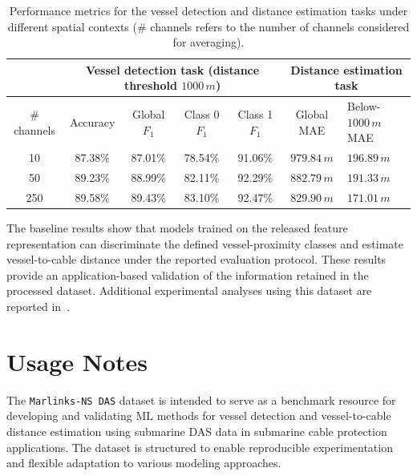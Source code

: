 \documentclass[11pt]{article}
\begin{document}
\begin{table}[htbp]
  \caption{Performance metrics for the vessel detection and distance estimation tasks under different spatial contexts (\textrm{\# channels} refers to the number of channels considered for averaging).}
  \label{tab:performance}
  \begin{tabular}{ccccccl}
    & \multicolumn{4}{c}{Vessel detection task (distance threshold $1000\,m$)} & \multicolumn{2}{c}{Distance estimation task} \\ \hline
    \# channels & Accuracy     & Global $F_1$     & Class 0 $F_1$     & Class 1 $F_1$     & Global MAE           & Below-$1000\,m$ MAE         \\ \hline
    10          &87.38\%              &87.01\%                   &78.54\%                    &91.06\%                    &$979.84\,m$                      &$196.89\,m$                       \\ \hline
    50          &89.23\%              &88.99\%                   &82.11\%                    &92.29\%                    &$882.79\,m$                      &$191.33\,m$                       \\ \hline
    250         &89.58\%              &89.43\%                   &83.10\%                    &92.47\%                    &$829.90\,m$                      &$171.01\,m$                       \\ \hline
  \end{tabular}
\end{table}

The baseline results show that models trained on the released feature representation can discriminate the defined vessel-proximity classes and estimate vessel-to-cable distance under the reported evaluation protocol. These results provide an application-based validation of the information retained in the processed dataset. Additional experimental analyses using this dataset are reported in~\cite{RamirezTorres2026VesselDAS}.


\section{Usage Notes}
\label{sec:usage notes}

The \texttt{Marlinks-NS DAS} dataset is intended to serve as a benchmark resource for developing and validating ML methods for vessel detection and vessel-to-cable distance estimation using submarine DAS data in submarine cable protection applications. The dataset is structured to enable reproducible experimentation and flexible adaptation to various modeling approaches.
\end{document}
